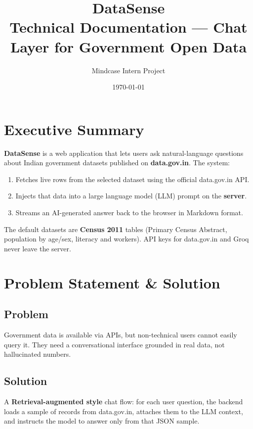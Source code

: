 \documentclass[11pt,a4paper]{article}
\title{\textbf{DataSense}\\[0.4em]
\large Technical Documentation --- Chat Layer for Government Open Data}
\author{Mindcase Intern Project}
\date{\today}
\begin{document}
\maketitle
\tableofcontents
\newpage

\section{Executive Summary}

\textbf{DataSense} is a web application that lets users ask natural-language questions about Indian government datasets published on \textbf{data.gov.in}. The system:

\begin{enumerate}[noitemsep]
  \item Fetches live rows from the selected dataset using the official data.gov.in API.
  \item Injects that data into a large language model (LLM) prompt on the \textbf{server}.
  \item Streams an AI-generated answer back to the browser in Markdown format.
\end{enumerate}

The default datasets are \textbf{Census 2011} tables (Primary Census Abstract, population by age/sex, literacy and workers). API keys for data.gov.in and Groq never leave the server.

\section{Problem Statement \& Solution}

\subsection{Problem}
Government data is available via APIs, but non-technical users cannot easily query it. They need a conversational interface grounded in real data, not hallucinated numbers.

\subsection{Solution}
A \textbf{Retrieval-augmented style} chat flow: for each user question, the backend loads a sample of records from data.gov.in, attaches them to the LLM context, and instructs the model to answer only from that JSON sample.
\end{document}

